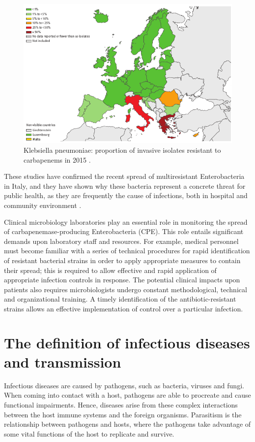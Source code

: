 \documentclass[11pt]{report}
\begin{document}
\clearpage
\begin{figure}[htp]
\centering
\includegraphics[scale=0.60]{img/K.pneu_2015.png}
\caption{Klebsiella pneumoniae: proportion of invasive isolates resistant to carbapenems in 2015 \cite{ECDC_Surveillance}.}
\label{}
\end{figure}

These studies have confirmed the recent spread of multiresistant Enterobacteria in Italy, and they have shown why these bacteria represent a concrete threat for public health, as they are frequently the cause of infections, both in hospital and community environment \cite{circolare2013}.

Clinical microbiology laboratories play an essential role in monitoring the spread of carbapenemase-producing Enterobacteria (CPE). 
This role entails significant demands upon laboratory staff and resources. For example, medical personnel must become familiar with a series of technical procedures for rapid identification of resistant bacterial strains in order to apply appropriate measures to contain their spread; this is required to allow effective and rapid application of appropriate infection controls in response. 
The potential clinical impacts upon patients also requires microbiologists undergo constant methodological, technical and organizational training. 
A timely identification of the antibiotic-resistant strains allows an effective implementation of control over a particular infection.

\section{The definition of infectious diseases and transmission}
Infectious diseases are caused by pathogens, such as bacteria, viruses and fungi. When coming into contact with a host, pathogens are able to procreate and cause functional impairments. Hence, diseases arise from these complex interactions between the host immune systems and the foreign organisms. Parasitism is the relationship between pathogens and hosts, where the pathogens take advantage of some vital functions of the host to replicate and survive. 
\end{document}
